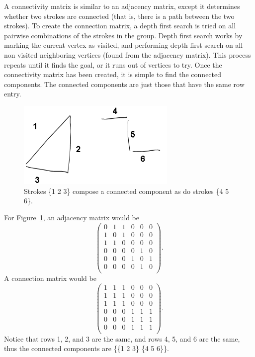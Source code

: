 \documentclass[10pt]{acmsiggraph}               %
\begin{document}
A connectivity matrix is similar to an adjacency matrix, except it determines whether two strokes are connected (that is, there is a path between the two strokes).
To create the connection matrix, a depth first search is tried on all pairwise combinations of the strokes in the group.
Depth first search works by marking the current vertex as visited, and performing depth first search on all non visited neighboring vertices (found from the adjacency matrix).
This process repeats until it finds the goal, or it runs out of vertices to try.
Once the connectivity matrix has been created, it is simple to find the connected components.
The connected components are just those that have the same row entry.

\begin{figure}[h]
\centering
\includegraphics[width=3.0in]{connections.png}%
\caption{Strokes \{1 2 3\} compose a connected component as do strokes \{4 5 6\}.}
\label{fig:connections}
\end{figure}

For Figure~\ref{fig:connections}, an adjacency matrix would be
$$
\left(
\begin{array}{cccccc}
0&1&1&0&0&0\\
1&0&1&0&0&0\\
1&1&0&0&0&0\\
0&0&0&0&1&0\\
0&0&0&1&0&1\\
0&0&0&0&1&0\\
\end{array}
\right).
$$
A connection matrix would be
$$
\left(
\begin{array}{cccccc}
1&1&1&0&0&0\\
1&1&1&0&0&0\\
1&1&1&0&0&0\\
0&0&0&1&1&1\\
0&0&0&1&1&1\\
0&0&0&1&1&1\\
\end{array}
\right).
$$
Notice that rows 1, 2, and 3 are the same, and rows 4, 5, and 6 are the same, thus the connected components are \{\{1 2 3\} \{4 5 6\}\}.
\end{document}
